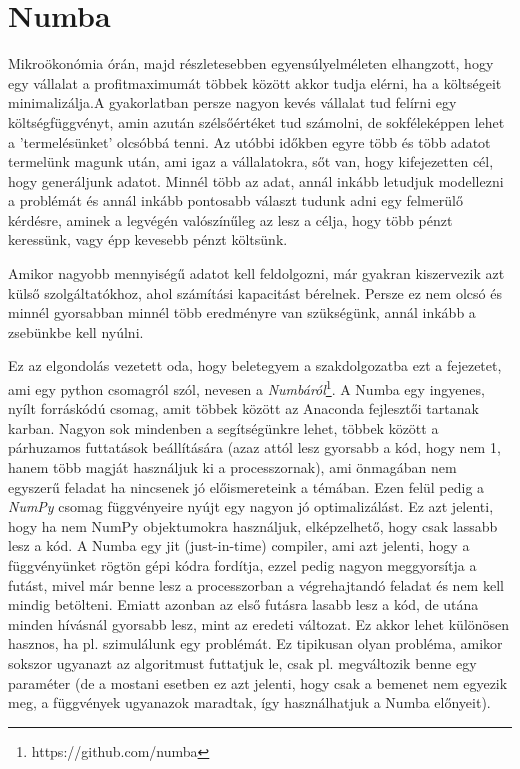 \documentclass{article}
\theoremstyle{definition}
\theoremstyle{theorem}
\begin{document}
\section{Numba}
Mikroökonómia órán, majd részletesebben egyensúlyelméleten elhangzott, hogy egy vállalat a profitmaximumát többek között akkor tudja elérni, ha a költségeit minimalizálja.A gyakorlatban persze nagyon kevés vállalat tud felírni egy költségfüggvényt, amin azután szélsőértéket tud számolni, de sokféleképpen lehet a 'termelésünket' olcsóbbá tenni. Az utóbbi időkben egyre több és több adatot termelünk magunk után, ami igaz a vállalatokra, sőt van, hogy kifejezetten cél, hogy generáljunk adatot. Minnél több az adat, annál inkább letudjuk modellezni a problémát és annál inkább pontosabb választ tudunk adni egy felmerülő kérdésre, aminek a legvégén valószínűleg az lesz a célja, hogy több pénzt keressünk, vagy épp kevesebb pénzt költsünk.

Amikor nagyobb mennyiségű adatot kell feldolgozni, már gyakran kiszervezik azt külső szolgáltatókhoz, ahol számítási kapacitást bérelnek. Persze ez nem olcsó és minnél gyorsabban minnél több eredményre van szükségünk, annál inkább a zsebünkbe kell nyúlni.

Ez az elgondolás vezetett oda, hogy beletegyem a szakdolgozatba ezt a fejezetet, ami egy python csomagról szól, nevesen a \textit{Numbáról}\footnote{https://github.com/numba}.
\newline
A Numba egy ingyenes, nyílt forráskódú csomag, amit többek között az Anaconda fejlesztői tartanak karban. Nagyon sok mindenben a segítségünkre lehet, többek között a párhuzamos futtatások beállítására (azaz attól lesz gyorsabb a kód, hogy nem 1, hanem több magját használjuk ki a processzornak), ami önmagában nem egyszerű feladat ha nincsenek jó előismereteink a témában. Ezen felül pedig a \textit{NumPy} csomag függvényeire nyújt egy nagyon jó optimalizálást. Ez azt jelenti, hogy ha nem NumPy objektumokra használjuk, elképzelhető, hogy csak lassabb lesz a kód.\newline
A Numba egy jit (just-in-time) compiler, ami azt jelenti, hogy a függvényünket rögtön gépi kódra fordítja, ezzel pedig nagyon meggyorsítja a futást, mivel már benne lesz a processzorban a végrehajtandó feladat és nem kell mindig betölteni. Emiatt azonban az első futásra lasabb lesz a kód, de utána minden hívásnál gyorsabb lesz, mint az eredeti változat. Ez akkor lehet különösen hasznos, ha pl. szimulálunk egy problémát. Ez tipikusan olyan probléma, amikor sokszor ugyanazt az algoritmust futtatjuk le, csak pl. megváltozik benne egy paraméter (de a mostani esetben ez azt jelenti, hogy csak a bemenet nem egyezik meg, a függvények ugyanazok maradtak, így használhatjuk a Numba előnyeit).
\end{document}
